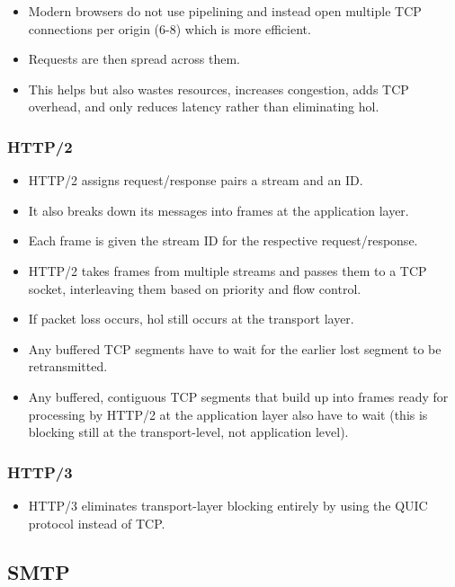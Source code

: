 \documentclass{article}
\begin{document}
\begin{itemize}
    \item Modern browsers do not use pipelining and instead open multiple TCP connections per origin (6-8) which is more efficient.
    \item Requests are then spread across them.
    \item This helps but also wastes resources, increases congestion, adds TCP overhead, and only reduces latency rather than eliminating \gls*{hol}.
\end{itemize}

\subsubsection{HTTP/2}

\begin{itemize}
    \item HTTP/2 assigns request/response pairs a stream and an ID.
    \item It also breaks down its messages into frames at the application layer.
    \item Each frame is given the stream ID for the respective request/response.
    \item HTTP/2 takes frames from multiple streams and passes them to a TCP socket, interleaving them based on priority and flow control.
    \item If packet loss occurs, \gls*{hol} still occurs at the transport layer.
    \item Any buffered TCP segments have to wait for the earlier lost segment to be retransmitted.
    \item Any buffered, contiguous TCP segments that build up into frames ready for processing by HTTP/2 at the application layer also have to wait (this is blocking still at the transport-level, not application level).
\end{itemize}

\subsubsection{HTTP/3}

\begin{itemize}
    \item HTTP/3 eliminates transport-layer blocking entirely by using the QUIC protocol instead of TCP.
\end{itemize}

\subsection{SMTP}
\end{document}
